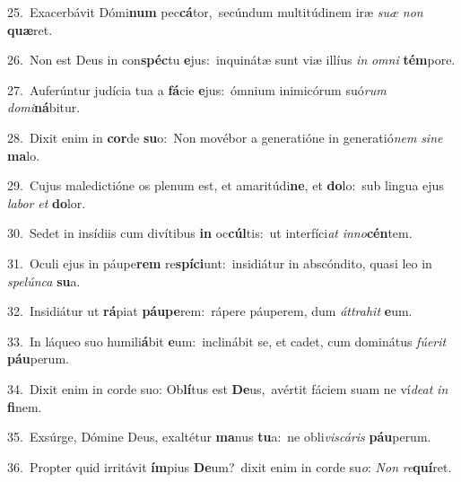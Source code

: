 {\numbfont\textcolor{\numbcolor}{25.}}~Exacerbávit Dómi\textbf{num} pec\-\textbf{cá}\-tor,~\star secúndum multitúdinem iræ \textit{su}\-\textit{æ} \textit{non} \textbf{quæ}\-ret.\par
{\numbfont\textcolor{\numbcolor}{26.}}~Non est Deus in con\-\textbf{spéc}\-tu \textbf{e}\-jus:~\star inquinátæ sunt viæ illíus \textit{in} \textit{om}\-\textit{ni} \textbf{tém}\-pore.\par
{\numbfont\textcolor{\numbcolor}{27.}}~Auferúntur judícia tua a \textbf{fá}\-cie \textbf{e}\-jus:~\star ómnium inimicórum suó\textit{rum} \textit{do}\-\textit{mi}\textbf{ná}bitur.\par
{\numbfont\textcolor{\numbcolor}{28.}}~Dixit enim in \textbf{cor}\-de \textbf{su}\-o:~\star Non movébor a generatióne in generatió\textit{nem} \textit{si}\-\textit{ne} \textbf{ma}\-lo.\par
{\numbfont\textcolor{\numbcolor}{29.}}~Cujus maledictióne os plenum est, et amaritúdi\-\textbf{ne}\-, et \textbf{do}\-lo:~\star sub lingua ejus \textit{la}\-\textit{bor} \textit{et} \textbf{do}\-lor.\par
{\numbfont\textcolor{\numbcolor}{30.}}~Sedet in insídiis cum divítibus \textbf{in} oc\-\textbf{cúl}\-tis:~\star ut interfíci\textit{at} \textit{in}\-\textit{no}\textbf{cén}tem.\par
{\numbfont\textcolor{\numbcolor}{31.}}~Oculi ejus in páupe\textbf{rem} re\-\textbf{spí}\-\textbf{ci}unt:~\star insidiátur in abscóndito, quasi leo in \textit{spe}\-\textit{lún}\textit{ca} \textbf{su}\-a.\par
{\numbfont\textcolor{\numbcolor}{32.}}~Insidiátur ut \textbf{rá}\-piat \textbf{páu}\-\textbf{pe}rem:~\star rápere páuperem, dum \textit{át}\-\textit{tra}\textit{hit} \textbf{e}\-um.\par
{\numbfont\textcolor{\numbcolor}{33.}}~In láqueo suo humili\-\textbf{á}\-bit \textbf{e}\-um:~\star inclinábit se, et cadet, cum dominátus \textit{fú}\-\textit{e}\textit{rit} \textbf{páu}\-perum.\par
{\numbfont\textcolor{\numbcolor}{34.}}~Dixit enim in corde suo: Ob\-\textbf{lí}\-tus est \textbf{De}\-us,~\star avértit fáciem suam ne ví\-\textit{de}\-\textit{at} \textit{in} \textbf{fi}\-nem.\par
{\numbfont\textcolor{\numbcolor}{35.}}~Exsúrge, Dómine Deus, exaltétur \textbf{ma}\-nus \textbf{tu}\-a:~\star ne obli\-\textit{vis}\-\textit{cá}\textit{ris} \textbf{páu}\-perum.\par
{\numbfont\textcolor{\numbcolor}{36.}}~Propter quid irritávit \textbf{ím}\-pius \textbf{De}\-um?~\star dixit enim in corde su\-\textit{o}\-: \textit{Non} \textit{re}\-\textbf{quí}ret.\par
